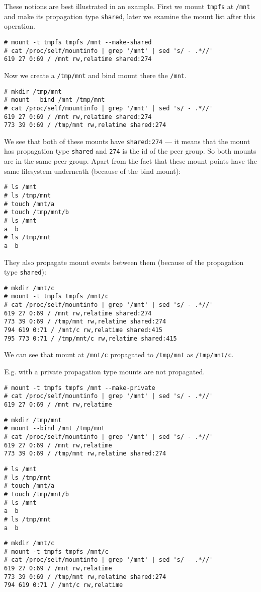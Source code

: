 \documentclass[en]{pracamgr}
\begin{document}
These notions are best illustrated in an example. First we mount \texttt{tmpfs} at \texttt{/mnt} and make its propagation type \texttt{shared}, later we examine the mount list after this operation.
\begin{lstlisting}
# mount -t tmpfs tmpfs /mnt --make-shared
# cat /proc/self/mountinfo | grep '/mnt' | sed 's/ - .*//'
619 27 0:69 / /mnt rw,relatime shared:274
\end{lstlisting}
Now we create a \texttt{/tmp/mnt} and bind mount there the \texttt{/mnt}.
\begin{lstlisting}
# mkdir /tmp/mnt
# mount --bind /mnt /tmp/mnt
# cat /proc/self/mountinfo | grep '/mnt' | sed 's/ - .*//'
619 27 0:69 / /mnt rw,relatime shared:274
773 39 0:69 / /tmp/mnt rw,relatime shared:274
\end{lstlisting}
We see that both of these mounts have \texttt{shared:274} --- it means that the mount has propagation type \texttt{shared} and \texttt{274} is the id of the peer group. So both mounts are in the same peer group.
Apart from the fact that these mount points have the same filesystem underneath (because of the bind mount):
\begin{lstlisting}
# ls /mnt
# ls /tmp/mnt
# touch /mnt/a
# touch /tmp/mnt/b
# ls /mnt
a  b
# ls /tmp/mnt
a  b
\end{lstlisting}
They also propagate mount events between them (because of the propagation type \texttt{shared}):
\begin{lstlisting}
# mkdir /mnt/c
# mount -t tmpfs tmpfs /mnt/c
# cat /proc/self/mountinfo | grep '/mnt' | sed 's/ - .*//'
619 27 0:69 / /mnt rw,relatime shared:274
773 39 0:69 / /tmp/mnt rw,relatime shared:274
794 619 0:71 / /mnt/c rw,relatime shared:415
795 773 0:71 / /tmp/mnt/c rw,relatime shared:415
\end{lstlisting}
We can see that mount at \texttt{/mnt/c} propagated to \texttt{/tmp/mnt} as \texttt{/tmp/mnt/c}.

E.g. with a private propagation type mounts are not propagated.
\begin{lstlisting}
# mount -t tmpfs tmpfs /mnt --make-private
# cat /proc/self/mountinfo | grep '/mnt' | sed 's/ - .*//'
619 27 0:69 / /mnt rw,relatime
\end{lstlisting}
\begin{lstlisting}
# mkdir /tmp/mnt
# mount --bind /mnt /tmp/mnt
# cat /proc/self/mountinfo | grep '/mnt' | sed 's/ - .*//'
619 27 0:69 / /mnt rw,relatime
773 39 0:69 / /tmp/mnt rw,relatime shared:274
\end{lstlisting}
\begin{lstlisting}
# ls /mnt
# ls /tmp/mnt
# touch /mnt/a
# touch /tmp/mnt/b
# ls /mnt
a  b
# ls /tmp/mnt
a  b
\end{lstlisting}
\begin{lstlisting}
# mkdir /mnt/c
# mount -t tmpfs tmpfs /mnt/c
# cat /proc/self/mountinfo | grep '/mnt' | sed 's/ - .*//'
619 27 0:69 / /mnt rw,relatime
773 39 0:69 / /tmp/mnt rw,relatime shared:274
794 619 0:71 / /mnt/c rw,relatime
\end{lstlisting}
\end{document}

